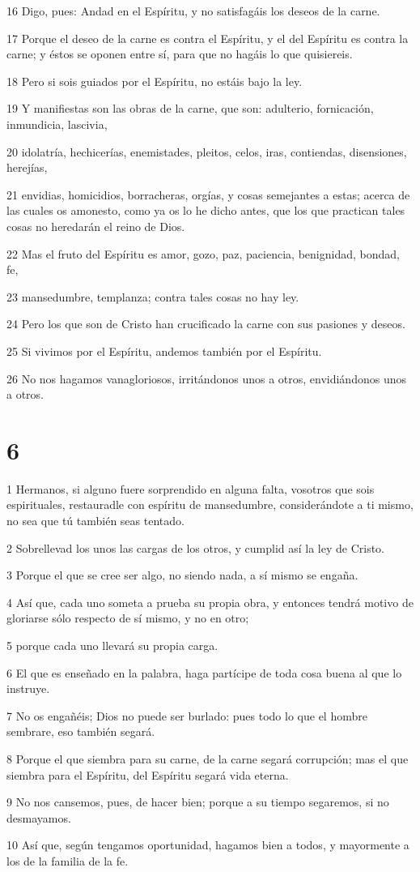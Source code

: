 \par 16 Digo, pues: Andad en el Espíritu, y no satisfagáis los deseos de la carne.
\par 17 Porque el deseo de la carne es contra el Espíritu, y el del Espíritu es contra la carne; y éstos se oponen entre sí, para que no hagáis lo que quisiereis.
\par 18 Pero si sois guiados por el Espíritu, no estáis bajo la ley.
\par 19 Y manifiestas son las obras de la carne, que son: adulterio, fornicación, inmundicia, lascivia,
\par 20 idolatría, hechicerías, enemistades, pleitos, celos, iras, contiendas, disensiones, herejías,
\par 21 envidias, homicidios, borracheras, orgías, y cosas semejantes a estas; acerca de las cuales os amonesto, como ya os lo he dicho antes, que los que practican tales cosas no heredarán el reino de Dios.
\par 22 Mas el fruto del Espíritu es amor, gozo, paz, paciencia, benignidad, bondad, fe,
\par 23 mansedumbre, templanza; contra tales cosas no hay ley.
\par 24 Pero los que son de Cristo han crucificado la carne con sus pasiones y deseos.
\par 25 Si vivimos por el Espíritu, andemos también por el Espíritu.
\par 26 No nos hagamos vanagloriosos, irritándonos unos a otros, envidiándonos unos a otros.

\chapter{6}

\par 1 Hermanos, si alguno fuere sorprendido en alguna falta, vosotros que sois espirituales, restauradle con espíritu de mansedumbre, considerándote a ti mismo, no sea que tú también seas tentado.
\par 2 Sobrellevad los unos las cargas de los otros, y cumplid así la ley de Cristo.
\par 3 Porque el que se cree ser algo, no siendo nada, a sí mismo se engaña.
\par 4 Así que, cada uno someta a prueba su propia obra, y entonces tendrá motivo de gloriarse sólo respecto de sí mismo, y no en otro;
\par 5 porque cada uno llevará su propia carga.
\par 6 El que es enseñado en la palabra, haga partícipe de toda cosa buena al que lo instruye.
\par 7 No os engañéis; Dios no puede ser burlado: pues todo lo que el hombre sembrare, eso también segará.
\par 8 Porque el que siembra para su carne, de la carne segará corrupción; mas el que siembra para el Espíritu, del Espíritu segará vida eterna.
\par 9 No nos cansemos, pues, de hacer bien; porque a su tiempo segaremos, si no desmayamos.
\par 10 Así que, según tengamos oportunidad, hagamos bien a todos, y mayormente a los de la familia de la fe.

